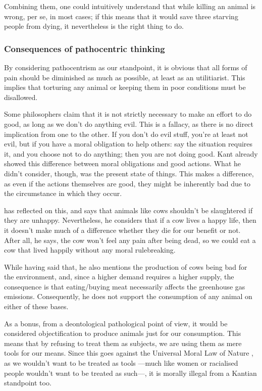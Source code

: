\documentclass{myassignment}
\begin{document}
\begin{answer}
		Combining them, one could intuitively understand that while killing an animal is wrong, per se, in most cases; if this means that it would save three starving people from dying, it nevertheless is the right thing to do.

		\subsubsection*{Consequences of pathocentric thinking}%

		By considering pathocentrism as our standpoint, it is obvious that all forms of pain should be diminished as much as possible, at least as an utilitiarist. This implies that torturing any animal or keeping them in poor conditions must be disallowed. 

		Some philosophers claim that it is not strictly necessary to make an effort to do good, as long as we don't do anything evil. This is a fallacy, as there is no direct implication from one to the other. If you don't do evil stuff, you're at least not evil, but if you have a moral obligation to help others: say the situation requires it, and you choose not to do anything; then you are not doing good. Kant already showed this difference between moral obligations and good actions. What he didn't consider, though, was the present state of things. This makes a difference, as even if the actions themselves are good, they might be inherently bad due to the circumstance in which they occur.

		\citet{singeryoutube} has reflected on this, and says that animals like cows shouldn't be slaughtered if they are unhappy. Nevertheless, he considers that if a cow lives a happy life, then it doesn't make much of a difference whether they die for our benefit or not. After all, he says, the cow won't feel any pain after being dead, so we could eat a cow that lived happily without any moral rulebreaking.

		While having said that, he also mentions the production of cows being bad for the environment, and, since a higher demand requires a higher supply, the consequence is that eating/buying meat necessarily affects the greenhouse gas emissions. Consequently, he does not support the consumption of any animal on either of these bases.

		As a bonus, from a deontological pathological point of view, it would be considered objectification to produce animals just for our consumption. This means that by refusing to treat them as subjects, we are using them as mere tools for our means. Since this goes against the Universal Moral Law of Nature \autocite{universallaw}, as we wouldn't want to be treated as tools ---much like women or racialised people wouldn't want to be treated as such---, it is morally illegal from a Kantian standpoint too.
 	\end{answer}

 	\printbibliography
\end{document}
